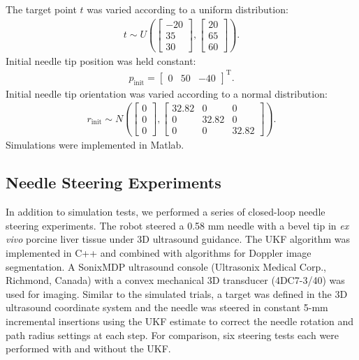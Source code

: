 The target point ${t}$ was varied according to a uniform distribution:
\begin{align}
{t} \sim U\left(
\begin{bmatrix} -20\\ 35\\ 30 \end{bmatrix},
\begin{bmatrix} 20\\ 65\\ 60 \end{bmatrix} \right).
\end{align}
Initial needle tip position was held constant: 
\begin{align*}
{p_{\text{init}}} = \begin{bmatrix} 0 & 50 & -40 \end{bmatrix}^{\text{T}}.
\end{align*}
Initial needle tip orientation was varied according to a normal distribution:
\begin{align}
{r_{\text{init}}} \sim N\left(
\begin{bmatrix} 0\\ 0\\ 0 \end{bmatrix},
\begin{bmatrix} 32.82 & 0 & 0\\ 0 & 32.82 & 0\\ 0 & 0 & 32.82 \end{bmatrix} \right).
\end{align}
Simulations were implemented in Matlab.

\subsection{Needle Steering Experiments}
In addition to simulation tests, we performed a series of closed-loop needle steering experiments. The robot steered a 0.58 mm needle with a bevel tip in \textit{ex vivo} porcine liver tissue under 3D ultrasound guidance. The UKF algorithm was implemented in C++ and combined with algorithms for Doppler image segmentation. A SonixMDP ultrasound console (Ultrasonix Medical Corp., Richmond, Canada) with a convex mechanical 3D transducer (4DC7-3/40) was used for imaging. Similar to the simulated trials, a target was defined in the 3D ultrasound coordinate system and the needle was steered in constant 5-mm incremental insertions using the UKF estimate to correct the needle rotation and path radius settings at each step. For comparison, six steering tests each were performed with and without the UKF.

